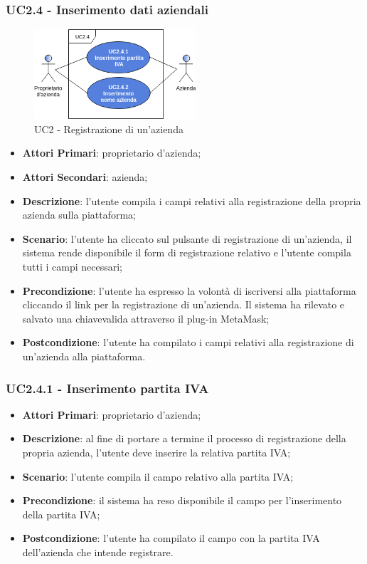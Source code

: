 \subsubsection{UC2.4 - Inserimento dati aziendali}
\begin{figure}[h]
	\includegraphics[width=6cm]{res/images/UC2-4RegistrazioneAzienda.png}
	\centering
	\caption{UC2 - Registrazione di un'azienda}
\end{figure}
\begin{itemize}
	\item \textbf{Attori Primari}: proprietario d'azienda;
	\item \textbf{Attori Secondari}: azienda;
	\item \textbf{Descrizione}: l'utente compila i campi relativi alla registrazione della propria azienda sulla piattaforma;
	\item \textbf{Scenario}: l'utente ha cliccato sul pulsante di registrazione di un'azienda, il sistema rende disponibile il form di registrazione relativo e l'utente compila tutti i campi necessari;
	\item \textbf{Precondizione}: l'utente ha espresso la volontà di iscriversi alla piattaforma cliccando il link per la registrazione di un'azienda. Il sistema ha rilevato e salvato una chiave\glosp valida attraverso il plug-in MetaMask\glo;
	\item \textbf{Postcondizione}: l'utente ha compilato i campi relativi alla registrazione di un'azienda alla piattaforma.
\end{itemize}
\subsubsection{UC2.4.1 - Inserimento partita IVA}
\begin{itemize}
	\item \textbf{Attori Primari}: proprietario d'azienda;
	\item \textbf{Descrizione}: al fine di portare a termine il processo di registrazione della propria azienda, l'utente deve inserire la relativa partita IVA;
	\item \textbf{Scenario}: l'utente compila il campo relativo alla partita IVA;
	\item \textbf{Precondizione}: il sistema ha reso disponibile il campo per l'inserimento della partita IVA;
	\item \textbf{Postcondizione}: l'utente ha compilato il campo con la partita IVA dell'azienda che intende registrare.
\end{itemize}
